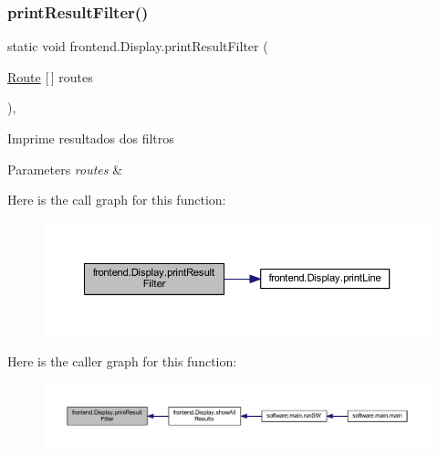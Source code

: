 \subsubsection{\texorpdfstring{print\+Result\+Filter()}{printResultFilter()}}
{\footnotesize\ttfamily static void frontend.\+Display.\+print\+Result\+Filter (\begin{DoxyParamCaption}\item[{\hyperlink{classdomain_1_1_route}{Route} \mbox{[}$\,$\mbox{]}}]{routes }\end{DoxyParamCaption})\hspace{0.3cm}{\ttfamily [static]}, {\ttfamily [private]}}

Imprime resultados dos filtros


\begin{DoxyParams}{Parameters}
{\em routes} & \\
\hline
\end{DoxyParams}
Here is the call graph for this function\+:\nopagebreak
\begin{figure}[H]
\begin{center}
\leavevmode
\includegraphics[width=350pt]{classfrontend_1_1_display_a7480b033057115a5237b26915b52bbf4_cgraph}
\end{center}
\end{figure}
Here is the caller graph for this function\+:\nopagebreak
\begin{figure}[H]
\begin{center}
\leavevmode
\includegraphics[width=350pt]{classfrontend_1_1_display_a7480b033057115a5237b26915b52bbf4_icgraph}
\end{center}
\end{figure}
\mbox{\label{classfrontend_1_1_display_ab2cef6740e59b37091b0215cf82a12f8}} 
